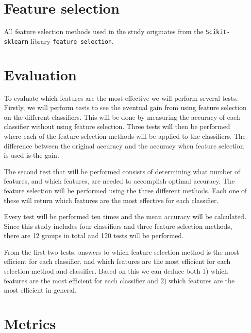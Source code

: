 \documentclass{kththesis}
\begin{document}
\section{Feature selection}

All feature selection methods used in the study originates from the \verb|Scikit-sklearn| library \verb|feature_selection|.


\section{Evaluation}


To  evaluate which features are the most effective we will perform several tests. Firstly, we will perform tests to see the eventual gain from using feature selection on the different classifiers. This will be done by measuring the accuracy of each classifier without using feature selection. Three tests will then be performed where each of the feature selection methods will be applied to the classifiers. The difference between the original accuracy and the accuracy when feature selection is used is the gain.

The second test that will be performed consists of determining what number of features, and which features, are needed to accomplish optimal accuracy. The feature selection will be performed using the three different methods. Each one of these will return which features are the most effective for each classifier.


Every test will be performed ten times and the mean accuracy will be calculated. Since this study includes four classifiers and three feature selection methods, there are 12 groups in total and 120 tests will be performed.

From the first two tests, answers to which feature selection method is the most efficient for each classifier, and which features are the most efficient for each selection method and classifier. Based on this we can deduce both 1) which features are the most efficient for each classifier and 2) which features are the most efficient in general.

\section{Metrics}
\end{document}
